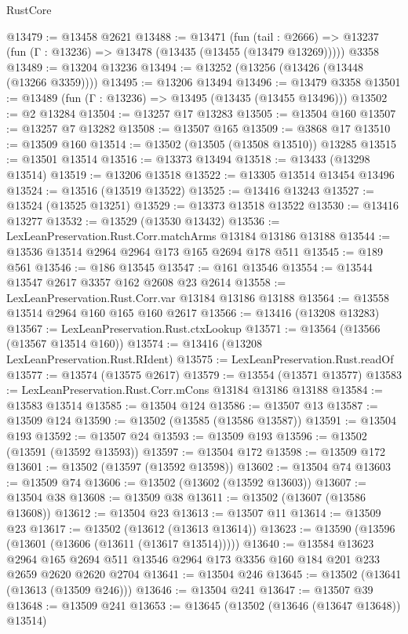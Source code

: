 \begin{lexlean}{RustCore}
\begin{coremodule}
@13479 := @13458 @2621
@13488 := @13471
    (fun (tail : @2666) => @13237 (fun (Γ : @13236) => @13478 (@13435 (@13455 (@13479 @13269)))))
    @3358
@13489 := @13204 @13236
@13494 := @13252 (@13256 (@13426 (@13448 (@13266 @3359))))
@13495 := @13206 @13494
@13496 := @13479 @3358
@13501 := @13489 (fun (Γ : @13236) => @13495 (@13435 (@13455 @13496)))
@13502 := @2 @13284
@13504 := @13257 @17 @13283
@13505 := @13504 @160
@13507 := @13257 @7 @13282
@13508 := @13507 @165
@13509 := @3868 @17
@13510 := @13509 @160
@13514 := @13502 (@13505 (@13508 @13510)) @13285
@13515 := @13501 @13514
@13516 := @13373 @13494
@13518 := @13433 (@13298 @13514)
@13519 := @13206 @13518
@13522 := @13305 @13514 @13454 @13496
@13524 := @13516 (@13519 @13522)
@13525 := @13416 @13243
@13527 := @13524 (@13525 @13251)
@13529 := @13373 @13518 @13522
@13530 := @13416 @13277
@13532 := @13529 (@13530 @13432)
@13536 := LexLeanPreservation.Rust.Corr.matchArms @13184 @13186 @13188
@13544 := @13536 @13514 @2964 @2964 @173 @165 @2694 @178 @511
@13545 := @189 @561
@13546 := @186 @13545
@13547 := @161 @13546
@13554 := @13544 @13547 @2617 @3357 @162 @2608 @23 @2614
@13558 := LexLeanPreservation.Rust.Corr.var @13184 @13186 @13188
@13564 := @13558 @13514 @2964 @160 @165 @160 @2617
@13566 := @13416 (@13208 @13283)
@13567 := LexLeanPreservation.Rust.ctxLookup
@13571 := @13564 (@13566 (@13567 @13514 @160))
@13574 := @13416 (@13208 LexLeanPreservation.Rust.RIdent)
@13575 := LexLeanPreservation.Rust.readOf
@13577 := @13574 (@13575 @2617)
@13579 := @13554 (@13571 @13577)
@13583 := LexLeanPreservation.Rust.Corr.mCons @13184 @13186 @13188
@13584 := @13583 @13514
@13585 := @13504 @124
@13586 := @13507 @13
@13587 := @13509 @124
@13590 := @13502 (@13585 (@13586 @13587))
@13591 := @13504 @193
@13592 := @13507 @24
@13593 := @13509 @193
@13596 := @13502 (@13591 (@13592 @13593))
@13597 := @13504 @172
@13598 := @13509 @172
@13601 := @13502 (@13597 (@13592 @13598))
@13602 := @13504 @74
@13603 := @13509 @74
@13606 := @13502 (@13602 (@13592 @13603))
@13607 := @13504 @38
@13608 := @13509 @38
@13611 := @13502 (@13607 (@13586 @13608))
@13612 := @13504 @23
@13613 := @13507 @11
@13614 := @13509 @23
@13617 := @13502 (@13612 (@13613 @13614))
@13623 := @13590 (@13596 (@13601 (@13606 (@13611 (@13617 @13514)))))
@13640 := @13584
    @13623
    @2964
    @165
    @2694
    @511
    @13546
    @2964
    @173
    @3356
    @160
    @184
    @201
    @233
    @2659
    @2620
    @2620
    @2704
@13641 := @13504 @246
@13645 := @13502 (@13641 (@13613 (@13509 @246)))
@13646 := @13504 @241
@13647 := @13507 @39
@13648 := @13509 @241
@13653 := @13645 (@13502 (@13646 (@13647 @13648)) @13514)

\end{coremodule}
\end{lexlean}

